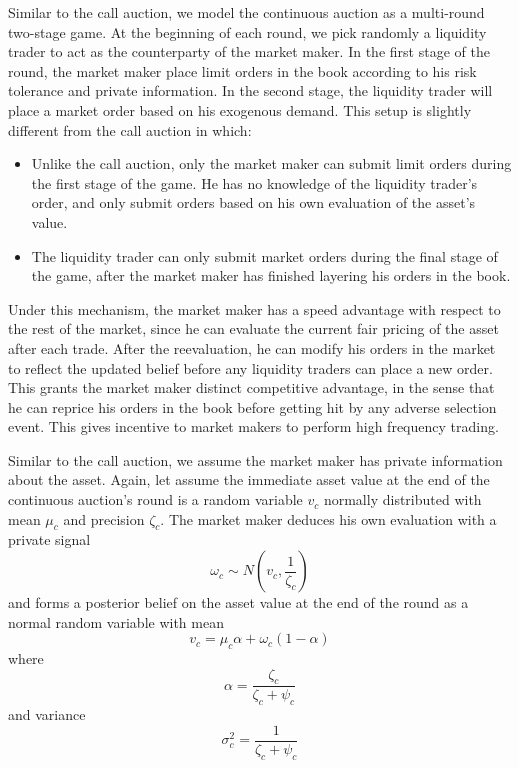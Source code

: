 \documentclass{article}
\begin{document}
Similar to the call auction, we model the continuous auction as a multi-round two-stage game. At the beginning of each round, we pick randomly a liquidity trader to act as the counterparty of the market maker. In the first stage of the round, the market maker place limit orders in the book according to his risk tolerance and private information. In the second stage, the liquidity trader will place a market order based on his exogenous demand. This setup is slightly different from the call auction in which:
\begin{itemize}
  \item Unlike the call auction, only the market maker can submit limit orders during the first stage of the game. He has no knowledge of the liquidity trader's order, and only submit orders based on his own evaluation of the asset's value.
  \item The liquidity trader can only submit market orders during the final stage of the game, after the market maker has finished layering his orders in the book.
\end{itemize}
Under this mechanism, the market maker has a speed advantage with respect to the rest of the market, since he can evaluate the current fair pricing of the asset after each trade. After the reevaluation, he can modify his orders in the market to reflect the updated belief before any liquidity traders can place a new order. This grants the market maker distinct competitive advantage, in the sense that he can reprice his orders in the book before getting hit by any adverse selection event. This gives incentive to market makers to perform high frequency trading.

Similar to the call auction, we assume the market maker has private information about the asset. Again, let assume the immediate asset value at the end of the continuous auction's round is a random variable $v_c$ normally distributed with mean $\mu_c$ and precision $\zeta_c$. The market maker deduces his own evaluation with a private signal
\[
  \omega_c \sim N(v_c, \frac{1}{\zeta_c})
\]
and forms a posterior belief on the asset value at the end of the round as a normal random variable with mean
\[
  v_c=\mu_c \alpha + \omega_c(1 - \alpha)
\]
where
\[
  \alpha = \frac{\zeta_c}{\zeta_c+\psi_c}
\]
and variance
\[
  \sigma_c^2=\frac{1}{\zeta_c+\psi_c}
\]
\end{document}
